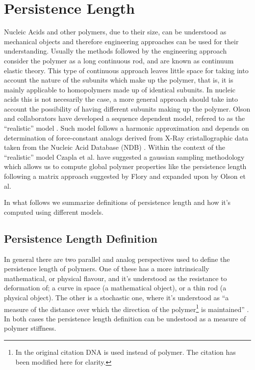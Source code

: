 \chapter{Persistence Length}
\label{appendix4a}

Nucleic Acids and other polymers, due to their size, can be understood
as  mechanical  objects  \cite{marko2003,  nelson2004}  and  therefore
engineering approaches  can be used for  their understanding.  Usually
the methods followed by  the engineering approach consider the polymer
as a long  continuous rod, and are known  as continuum elastic theory.
This type of  continuous approach leaves little space  for taking into
account the nature of the subunits which make up the polymer, that is,
it  is  mainly  applicable   to  homopolymers  made  up  of  identical
subunits. In  nucleic acids  this is not  necesarily the case,  a more
general approach  should take into  account the possibility  of having
different  subunits making  up the  polymer.  Olson  and collaborators
have  developed  a  sequence   dependent  model,  refered  to  as  the
``realistic'' model  \cite{olson1993}.  Such model  follows a harmonic
approximation and  depends on determination  of force-constant analogs
derived from  X-Ray cristallographic data taken from  the Nucleic Acid
Database (NDB)  \cite{go1976, olson1998}.   Within the context  of the
``realistic'' model Czapla et  al.  \cite{czapla2006} have suggested a
gaussian  sampling  methodology  which  allows us  to  compute  global
polymer  properties like  the  persistence length  following a  matrix
approach  suggested by  Flory  \cite{flory1969} and  expanded upon  by
Olson et al. \cite{maroun1988a, marky1994a}

In what follows we summarize definitions of persistence length and how
it's computed using different models.

\section{Persistence Length Definition}
In  general there  are two  parallel and  analog perspectives  used to
define the  persistence length  of polymers. One  of these has  a more
intrinsically mathematical,  or physical flavour,  and it's understood
as the resistance to deformation  of; a curve in space (a mathematical
object), or a thin rod (a physical object).  The other is a stochastic
one, where it's  understood as ``a measure of  the distance over which
the direction of the  polymer\footnote{In the original citation DNA is
  used instead  of polymer.  The citation has  been modified  here for
  clarity.}  is  maintained''  \cite{olson1995}.   In both  cases  the
persistence length definition can be undestood as a measure of polymer
stiffness.


